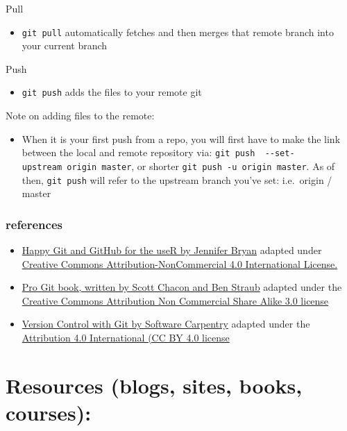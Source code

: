 \documentclass[
]{book}
\providecommand{\tightlist}{%
  \setlength{\itemsep}{0pt}\setlength{\parskip}{0pt}}
\begin{document}
Pull

\begin{itemize}
\tightlist
\item
  \texttt{git\ pull} automatically fetches and then merges that remote branch into your current branch
\end{itemize}

Push

\begin{itemize}
\tightlist
\item
  \texttt{git\ push} adds the files to your remote git
\end{itemize}

Note on adding files to the remote:

\begin{itemize}
\tightlist
\item
  When it is your first push from a repo, you will first have to make the link between the local and remote repository via: \texttt{git\ push\ \ -\/-set-upstream\ origin\ master}, or shorter \texttt{git\ push\ -u\ origin\ master}. As of then, \texttt{git\ push} will refer to the upstream branch you've set: i.e.~origin / master
\end{itemize}

\hypertarget{references}{%
\subsection{references}\label{references}}

\begin{itemize}
\tightlist
\item
  \href{http://happygitwithr.com/rmd-test-drive.html}{Happy Git and GitHub for the useR by Jennifer Bryan} adapted under \href{https://creativecommons.org/licenses/by/4.0/}{Creative Commons Attribution-NonCommercial 4.0 International License.}
\item
  \href{https://git-scm.com/book/en/v2}{Pro Git book, written by Scott Chacon and Ben Straub} adapted under the \href{https://creativecommons.org/licenses/by/3.0/}{Creative Commons Attribution Non Commercial Share Alike 3.0 license}
\item
  \href{http://swcarpentry.github.io/git-novice/}{Version Control with Git by Software Carpentry} adapted under the \href{https://creativecommons.org/licenses/by/4.0/}{Attribution 4.0 International (CC BY 4.0 license}
\end{itemize}

\hypertarget{resources-blogs-sites-books-courses}{%
\chapter{Resources (blogs, sites, books, courses):}\label{resources-blogs-sites-books-courses}}
\end{document}
